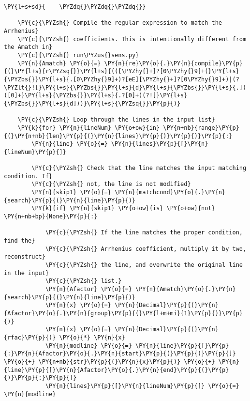 \begin{Verbatim}[commandchars=\\\{\}]
\PY{l+s+sd}{    \PYZdq{}\PYZdq{}\PYZdq{}}

    \PY{c}{\PYZsh{} Compile the regular expression to match the Arrhenius}
    \PY{c}{\PYZsh{} coefficients. This is intentionally different from the Amatch in}
    \PY{c}{\PYZsh{} run\PYZus{}sens.py}
    \PY{n}{Amatch} \PY{o}{=} \PY{n}{re}\PY{o}{.}\PY{n}{compile}\PY{p}{(}\PY{l+s}{r\PYZsq{}}\PY{l+s}{(([\PYZhy{}+]?[0\PYZhy{}9]+(}\PY{l+s}{\PYZbs{}}\PY{l+s}{.[0\PYZhy{}9]+)?[eE][\PYZhy{}+]?[0\PYZhy{}9]+)|(?\PYZlt{}![}\PY{l+s}{\PYZbs{}}\PY{l+s}{d}\PY{l+s}{\PYZbs{}}\PY{l+s}{.])([0]+}\PY{l+s}{\PYZbs{}}\PY{l+s}{.?[0]+)(?![}\PY{l+s}{\PYZbs{}}\PY{l+s}{d]))}\PY{l+s}{\PYZsq{}}\PY{p}{)}

    \PY{c}{\PYZsh{} Loop through the lines in the input list}
    \PY{k}{for} \PY{n}{lineNum} \PY{o+ow}{in} \PY{n+nb}{range}\PY{p}{(}\PY{n+nb}{len}\PY{p}{(}\PY{n}{lines}\PY{p}{)}\PY{p}{)}\PY{p}{:}
        \PY{n}{line} \PY{o}{=} \PY{n}{lines}\PY{p}{[}\PY{n}{lineNum}\PY{p}{]}

        \PY{c}{\PYZsh{} Check that the line matches the input matching condition. If}
        \PY{c}{\PYZsh{} not, the line is not modified}
        \PY{n}{skip1} \PY{o}{=} \PY{n}{matchcond}\PY{o}{.}\PY{n}{search}\PY{p}{(}\PY{n}{line}\PY{p}{)}
        \PY{k}{if} \PY{n}{skip1} \PY{o+ow}{is} \PY{o+ow}{not} \PY{n+nb+bp}{None}\PY{p}{:}

            \PY{c}{\PYZsh{} If the line matches the proper condition, find the}
            \PY{c}{\PYZsh{} Arrhenius coefficient, multiply it by two, reconstruct}
            \PY{c}{\PYZsh{} the line, and overwrite the original line in the input}
            \PY{c}{\PYZsh{} list.}
            \PY{n}{Afactor} \PY{o}{=} \PY{n}{Amatch}\PY{o}{.}\PY{n}{search}\PY{p}{(}\PY{n}{line}\PY{p}{)}
            \PY{n}{x} \PY{o}{=} \PY{n}{Decimal}\PY{p}{(}\PY{n}{Afactor}\PY{o}{.}\PY{n}{group}\PY{p}{(}\PY{l+m+mi}{1}\PY{p}{)}\PY{p}{)}
            \PY{n}{x} \PY{o}{=} \PY{n}{Decimal}\PY{p}{(}\PY{n}{rfac}\PY{p}{)} \PY{o}{*} \PY{n}{x}
            \PY{n}{modline} \PY{o}{=} \PY{n}{line}\PY{p}{[}\PY{p}{:}\PY{n}{Afactor}\PY{o}{.}\PY{n}{start}\PY{p}{(}\PY{p}{)}\PY{p}{]} \PY{o}{+} \PY{n+nb}{str}\PY{p}{(}\PY{n}{x}\PY{p}{)} \PY{o}{+} \PY{n}{line}\PY{p}{[}\PY{n}{Afactor}\PY{o}{.}\PY{n}{end}\PY{p}{(}\PY{p}{)}\PY{p}{:}\PY{p}{]}
            \PY{n}{lines}\PY{p}{[}\PY{n}{lineNum}\PY{p}{]} \PY{o}{=} \PY{n}{modline}


\end{Verbatim}
